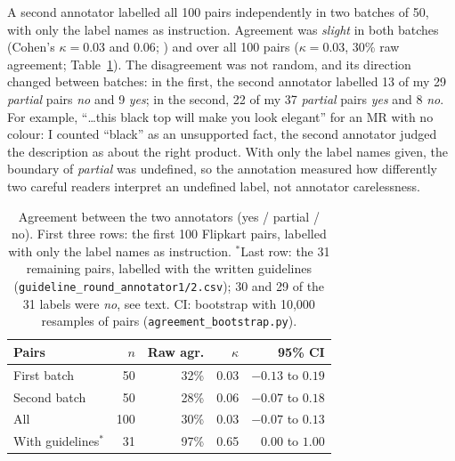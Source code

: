 \documentclass[11pt]{article}
\begin{document}
A second annotator labelled all 100 pairs independently in two batches of 50, with only the label names as instruction. Agreement was \emph{slight} \citep{landis-koch-1977} in both batches (Cohen's $\kappa = 0.03$ and $0.06$; \citealp{cohen-1960-kappa}) and over all 100 pairs ($\kappa = 0.03$, 30\% raw agreement; Table~\ref{tab:kappa}). The disagreement was not random, and its direction changed between batches: in the first, the second annotator labelled 13 of my 29 \emph{partial} pairs \emph{no} and 9 \emph{yes}; in the second, 22 of my 37 \emph{partial} pairs \emph{yes} and 8 \emph{no}. For example, ``\dots this black top will make you look elegant'' for an MR with no colour: I counted ``black'' as an unsupported fact, the second annotator judged the description as about the right product. With only the label names given, the boundary of \emph{partial} was undefined, so the annotation measured how differently two careful readers interpret an undefined label, not annotator carelessness.

\begin{table}[t]
\centering\small
\begin{tabular}{@{}lrrrr@{}}
\toprule
Pairs & $n$ & Raw agr. & $\kappa$ & 95\% CI \\
\midrule
First batch & 50 & 32\% & 0.03 & $-0.13$ to $0.19$ \\
Second batch & 50 & 28\% & 0.06 & $-0.07$ to $0.18$ \\
All & 100 & 30\% & 0.03 & $-0.07$ to $0.13$ \\
\midrule
With guidelines$^\ast$ & 31 & 97\% & 0.65 & $0.00$ to $1.00$ \\
\bottomrule
\end{tabular}
\caption{Agreement between the two annotators (yes / partial / no). First three rows: the first 100 Flipkart pairs, labelled with only the label names as instruction. $^\ast$Last row: the 31 remaining pairs, labelled with the written guidelines (\texttt{guideline\_round\_annotator1/2.csv}); 30 and 29 of the 31 labels were \emph{no}, see text. CI: bootstrap with 10{,}000 resamples of pairs (\texttt{agreement\_bootstrap.py}).}
\label{tab:kappa}
\end{table}
\end{document}
